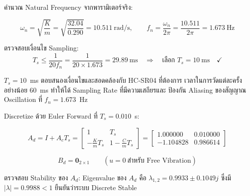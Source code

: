 คำนวณ Natural Frequency จากพารามิเตอร์จริง:

\begin{equation}
    \omega_n = \sqrt{\frac{K}{m}} = \sqrt{\frac{32.04}{0.290}} = 10.511\ \text{rad/s},
    \qquad
    f_n = \frac{\omega_n}{2\pi} = \frac{10.511}{2\pi} = 1.673\ \text{Hz}
    \label{eq:omega_n_numerical}
\end{equation}

ตรวจสอบเงื่อนไข Sampling:
\begin{equation}
    T_s \leq \frac{1}{20 f_n} = \frac{1}{20 \times 1.673} = 29.89\ \text{ms}
    \quad \Rightarrow \quad \text{เลือก } T_s = 10\ \text{ms} \quad \checkmark
    \label{eq:ts_choice}
\end{equation}

$T_s = 10$~ms ตอบสนองเงื่อนไขและสอดคล้องกับ HC-SR04 ที่ต้องการ
เวลาในการวัดแต่ละครั้งอย่างน้อย 60~ms ทำให้ได้ Sampling Rate ที่มีความเสถียรและ
ป้องกัน Aliasing ของสัญญาณ Oscillation ที่ $f_n = 1.673$~Hz

Discretize ด้วย Euler Forward ที่ $T_s = 0.010$~s:

\begin{equation}
    A_d = I + A_c T_s
        = \begin{bmatrix} 1 & T_s \\ -\frac{K}{m}T_s & 1-\frac{C}{m}T_s \end{bmatrix}
        = \begin{bmatrix} 1.000000 & 0.010000 \\ -1.104828 & 0.986614 \end{bmatrix}
    \label{eq:Ad_result}
\end{equation}

\begin{equation}
    B_d = \mathbf{0}_{2\times1}
    \qquad (u = 0\ \text{สำหรับ Free Vibration})
    \label{eq:Bd_result}
\end{equation}

ตรวจสอบ Stability ของ $A_d$: Eigenvalue ของ $A_d$ คือ
$\lambda_{1,2} = 0.9933 \pm 0.1049j$
ซึ่งมี $|\lambda| = 0.9988 < 1$ ยืนยันว่าระบบ Discrete Stable

